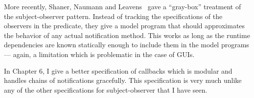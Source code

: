More recently, Shaner, Naumann and Leavens~\cite{ShanerLN07} gave a
``gray-box'' treatment of the subject-observer pattern.  Instead of
tracking the specifications of the observers in the predicate, they
give a model program that should approximates the behavior of any
actual notification method. This works as long as the runtime
dependencies are known statically enough to include them in the model
programs --- again, a limitation which is problematic in the case of
GUIs.

In Chapter 6, I give a better specification of callbacks which is
modular and handles chains of notifications gracefully. This
specification is very much unlike any of the other specifications for
subject-observer that I have seen. 




% 
% 
% 
% 
% 
